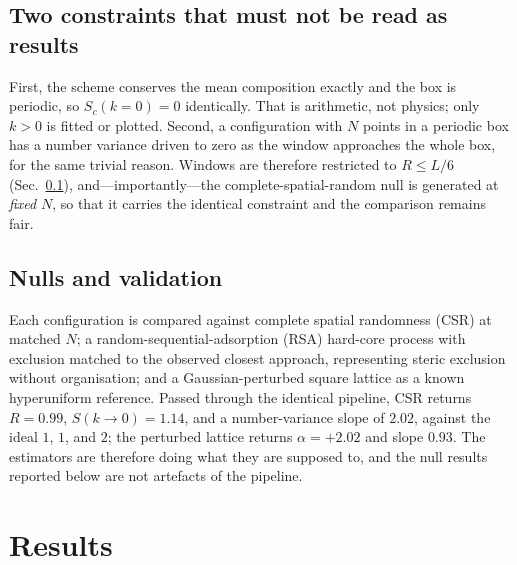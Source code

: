 \documentclass[aps,pre,twocolumn,superscriptaddress,floatfix,longbibliography]{revtex4-2}
\begin{document}
\subsection{Two constraints that must not be read as results}
\label{sec:constraints}

First, the scheme conserves the mean composition exactly and the box is
periodic, so $S_c(k = 0) = 0$ identically. That is arithmetic, not physics;
only $k > 0$ is fitted or plotted. Second, a configuration with $N$ points in
a periodic box has a number variance driven to zero as the window approaches
the whole box, for the same trivial reason. Windows are therefore restricted
to $R \le L/6$ (Sec.~\ref{sec:constraints}), and---importantly---the complete-spatial-random null is
generated at \emph{fixed} $N$, so that it carries the identical constraint and
the comparison remains fair.

\subsection{Nulls and validation}

Each configuration is compared against complete spatial randomness (CSR) at
matched $N$; a random-sequential-adsorption (RSA) hard-core process with
exclusion matched to the observed closest approach, representing steric
exclusion without organisation; and a Gaussian-perturbed square lattice as a
known hyperuniform reference. Passed through the identical pipeline, CSR
returns $R = 0.99$, $S(k \to 0) = 1.14$, and a number-variance slope of
$2.02$, against the ideal $1$, $1$, and $2$; the perturbed lattice returns
$\alpha = +2.02$ and slope $0.93$. The estimators are therefore doing what
they are supposed to, and the null results reported below are not artefacts of
the pipeline.

\section{Results}
\end{document}
